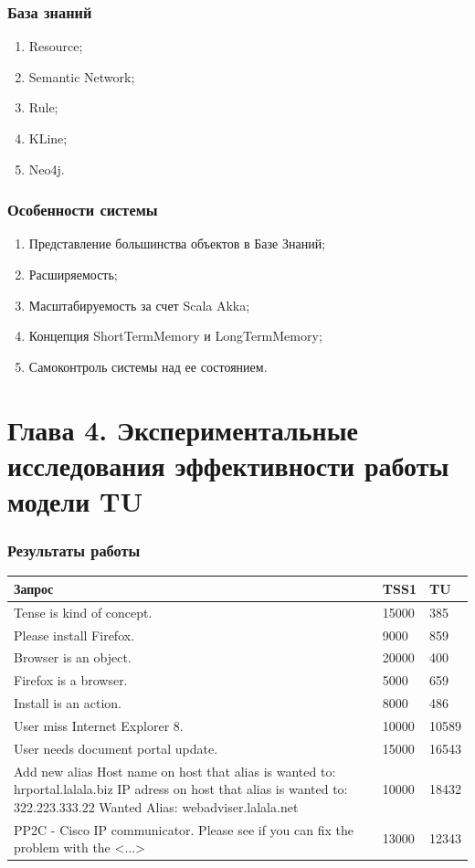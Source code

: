 \documentclass[14pt]{beamer}
\begin{document}
\begin{frame}
\frametitle{База знаний}
\begin{enumerate}
	\item Resource;
	\item Semantic Network;
	\item Rule;
	\item KLine;
	\item Neo4j.
\end{enumerate}
\end{frame}

\begin{frame}
\frametitle{Особенности системы}
\begin{enumerate}
	\item Представление большинства объектов в Базе Знаний;
	\item Расширяемость;
	\item Масштабируемость за счет Scala Akka;
	\item Концепция ShortTermMemory и LongTermMemory;
	\item Самоконтроль системы над ее состоянием.
\end{enumerate}
\end{frame}


%
%
\section[Глава 4]{Глава 4. Экспериментальные исследования эффективности работы модели TU}



\begin{frame}
\frametitle{Результаты работы}
\begin{table}
	
\small
\begin{tabular} {|p{8cm}|p{1cm}|p{1cm}|}

\hline
\textbf{Запрос} & TSS1 & TU \\
\hline
  Tense is kind of concept. & 15000 & 385 \\
  
  \hline
  Please install Firefox.  & 9000 & 859 \\
  \hline
  Browser is an object.   & 20000 & 400 \\
  \hline
  Firefox is a browser.   & 5000 & 659  \\
  \hline
  Install is an action.    & 8000 & 486 \\
  \hline
  User miss Internet Explorer 8.     & 10000 & 10589 \\
  \hline
  User needs document portal update.    & 15000 & 16543 \\
  \hline
  Add new alias Host name on host that alias is wanted to: hrportal.lalala.biz IP adress on host that alias is wanted to: 322.223.333.22 Wanted Alias:    webadviser.lalala.net    & 10000 & 18432  \\ 
  \hline
  PP2C - Cisco IP communicator. Please see if you can fix the problem with the <...> & 13000 & 12343 \\ 
   \hline
   \end{tabular}
\end{table}
\end{frame}
\end{document}
